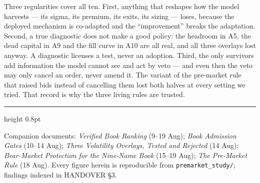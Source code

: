 \documentclass[11pt,a4paper]{article}
\begin{document}
\begin{tcolorbox}[colback=bcnavy!5, colframe=bcnavy, boxrule=0.8pt,
  title={\bfseries What the failures have in common}, coltitle=white]
Three regularities cover all ten. First, anything that reshapes how the
model harvests --- its sigma, its premium, its exits, its sizing --- loses,
because the deployed mechanism is co-adapted and the ``improvement'' breaks
the adaptation. Second, a true diagnostic does not make a good policy: the
headroom in A5, the dead capital in A9 and the fill curve in A10 are all
real, and all three overlays lost anyway. A diagnostic licenses a test,
never an adoption. Third, the only survivors add information the model
cannot see and act by veto --- and even then the veto may only cancel an
order, never amend it. The variant of the pre-market rule that raised bids
instead of cancelling them lost both halves at every setting we tried. That
record is why the three living rules are trusted.
\end{tcolorbox}

\vspace{0.4cm}
{\color{bcnavy}\hrule height 0.8pt}
\vspace{0.2cm}
{\footnotesize\color{bcgrey} Companion documents: \emph{Verified Book Ranking}
(9--19 Aug); \emph{Book Admission Gates} (10--14 Aug); \emph{Three Volatility
Overlays, Tested and Rejected} (14 Aug); \emph{Bear-Market Protection for the
Nine-Name Book} (15--19 Aug); \emph{The Pre-Market Rule} (18 Aug). Every
figure herein is reproducible from \texttt{premarket\_study/}; findings
indexed in HANDOVER \S3.}
\end{document}
